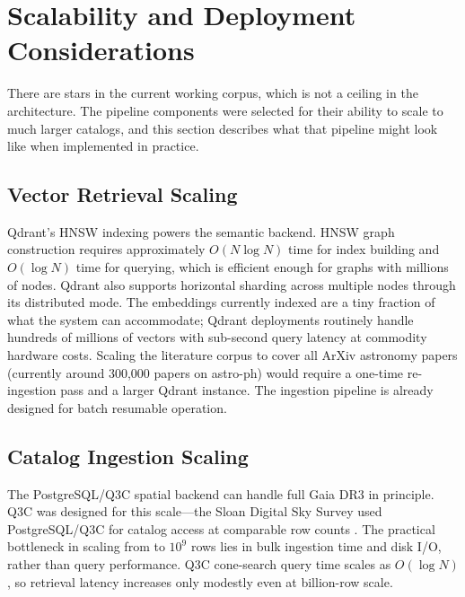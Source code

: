 \documentclass[preprint,12pt,authoryear]{elsarticle}
\begin{document}
\section{Scalability and Deployment Considerations}
\label{sec:scalability}

There are \nStarsReal{} stars in the current working corpus, which is not a ceiling in the architecture. The pipeline components were selected for their ability to scale to much larger catalogs, and this section describes what that pipeline might look like when implemented in practice.

\subsection{Vector Retrieval Scaling}

Qdrant’s HNSW indexing \citep{Malkov2020} powers the semantic backend. HNSW graph construction requires approximately $O(N \log N)$ time for index building and $O(\log N)$ time for querying, which is efficient enough for graphs with millions of nodes. Qdrant also supports horizontal sharding across multiple nodes through its distributed mode.
The \nPapersQdrant{} embeddings currently indexed are a tiny fraction of what the system can accommodate; Qdrant deployments routinely handle hundreds of millions of vectors with sub-second query latency at commodity hardware costs. Scaling the literature corpus to cover all ArXiv astronomy papers (currently around 300,000 papers on astro-ph) would require a one-time re-ingestion pass and a larger Qdrant instance. The ingestion pipeline is already designed for batch resumable operation.

\subsection{Catalog Ingestion Scaling}

The PostgreSQL/Q3C spatial backend can handle full Gaia DR3 in principle. Q3C was designed for this scale---the Sloan Digital Sky Survey used PostgreSQL/Q3C for catalog access at comparable row counts \citep{York2000}. The practical bottleneck in scaling from \nStarsReal{} to $10^9$ rows lies in bulk ingestion time and disk I/O, rather than query performance. Q3C cone-search query time scales as $O(\log N)$, so retrieval latency increases only modestly even at billion-row scale.
\end{document}
